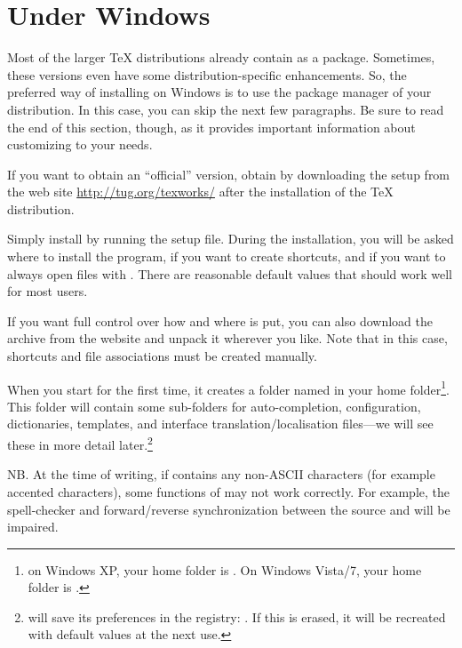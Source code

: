 \section{Under Windows}

Most of the larger {\TeX} distributions already contain {\Tw} as a package. Sometimes, these versions even have some distribution-specific enhancements. So, the preferred way of installing {\Tw} on Windows is to use the package manager of your distribution. In this case, you can skip the next few paragraphs. Be sure to read the end of this section, though, as it provides important information about customizing {\Tw} to your needs.

If you want to obtain an ``official'' version, obtain {\Tw} by downloading the setup from the {\Tw} web site \url{http://tug.org/texworks/} after the installation of the {\TeX} distribution.

Simply install {\Tw} by running the setup file. During the installation, you will be asked where to install the program, if you want to create shortcuts, and if you want to always open  files with {\Tw}. There are reasonable default values that should work well for most users.

If you want full control over how and where {\Tw} is put, you can also download the  archive from the website and unpack it wherever you like. Note that in this case, shortcuts and file associations must be created manually.

\urldef{\TwRegistryPath}

When you start {\Tw} for the first time, it creates a folder named  in your home folder\footnote{on Windows XP, your home folder is . On Windows Vista/7, your home folder is .}. This folder will contain some sub-folders for auto-completion, configuration, dictionaries, templates, and interface translation/localisation files---we will see these in more detail later.\footnote{{\Tw} will save its preferences in the registry:
\TwRegistryPath. If this is erased, it will be recreated with default values at the next use.}

NB. At the time of writing, if  contains any non-ASCII characters (for example accented characters), some functions of {\Tw} may not work correctly. For example, the spell-checker and forward/reverse synchronization between the source and  will be impaired.

